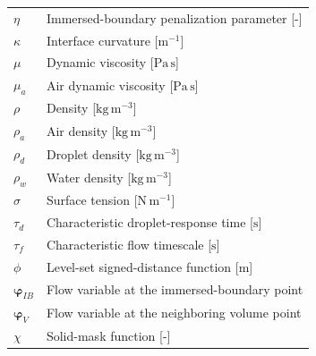 \begin{longtable}{lp{5in}}
$\eta$                       & Immersed-boundary penalization parameter [-]\\
$\kappa$                     & Interface curvature [$\mathrm{m^{-1}}$]\\
$\mu$                        & Dynamic viscosity [$\mathrm{Pa\,s}$]\\
$\mu_a$                      & Air dynamic viscosity [$\mathrm{Pa\,s}$]\\
$\rho$                       & Density [$\mathrm{kg\,m^{-3}}$]\\
$\rho_a$                     & Air density [$\mathrm{kg\,m^{-3}}$]\\
$\rho_d$                     & Droplet density [$\mathrm{kg\,m^{-3}}$]\\
$\rho_w$                     & Water density [$\mathrm{kg\,m^{-3}}$]\\
$\sigma$                     & Surface tension [$\mathrm{N\,m^{-1}}$]\\
$\tau_d$                     & Characteristic droplet-response time [$\mathrm{s}$]\\
$\tau_f$                     & Characteristic flow timescale [$\mathrm{s}$]\\
$\phi$                       & Level-set signed-distance function [$\mathrm{m}$]\\
$\boldsymbol{\varphi}_{IB}$  & Flow variable at the immersed-boundary point\\
$\boldsymbol{\varphi}_{V}$   & Flow variable at the neighboring volume point\\
$\chi$                       & Solid-mask function [-]\\
\end{longtable}
